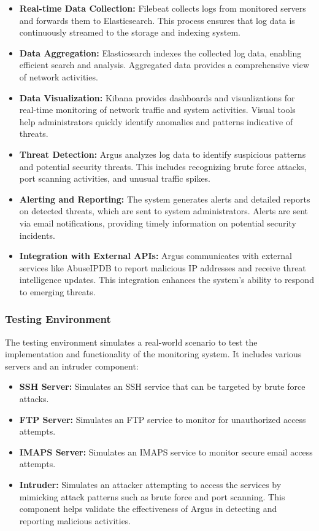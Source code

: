 \documentclass{article}
\begin{document}
    \begin{itemize}
        \item \textbf{Real-time Data Collection:} Filebeat collects logs from monitored servers and forwards them to Elasticsearch.
        This process ensures that log data is continuously streamed to the storage and indexing system.
        \item \textbf{Data Aggregation:} Elasticsearch indexes the collected log data, enabling efficient search and analysis.
        Aggregated data provides a comprehensive view of network activities.
        \item \textbf{Data Visualization:} Kibana provides dashboards and visualizations for real-time monitoring of network traffic and system activities.
        Visual tools help administrators quickly identify anomalies and patterns indicative of threats.
        \item \textbf{Threat Detection:} Argus analyzes log data to identify suspicious patterns and potential security threats.
        This includes recognizing brute force attacks, port scanning activities, and unusual traffic spikes.
        \item \textbf{Alerting and Reporting:} The system generates alerts and detailed reports on detected threats, which are sent to system administrators.
        Alerts are sent via email notifications, providing timely information on potential security incidents.
        \item \textbf{Integration with External APIs:} Argus communicates with external services like AbuseIPDB to report malicious IP addresses and receive threat intelligence updates.
        This integration enhances the system's ability to respond to emerging threats.
    \end{itemize}

    \subsubsection{Testing Environment}\label{subsubsec:testing-environment}

    The testing environment simulates a real-world scenario to test the implementation and functionality of the monitoring system.
    It includes various servers and an intruder component:

    \begin{itemize}
        \item \textbf{SSH Server:} Simulates an SSH service that can be targeted by brute force attacks.
        \item \textbf{FTP Server:} Simulates an FTP service to monitor for unauthorized access attempts.
        \item \textbf{IMAPS Server:} Simulates an IMAPS service to monitor secure email access attempts.
        \item \textbf{Intruder:} Simulates an attacker attempting to access the services by mimicking attack patterns such as brute force and port scanning.
        This component helps validate the effectiveness of Argus in detecting and reporting malicious activities.
    \end{itemize}
\end{document}
